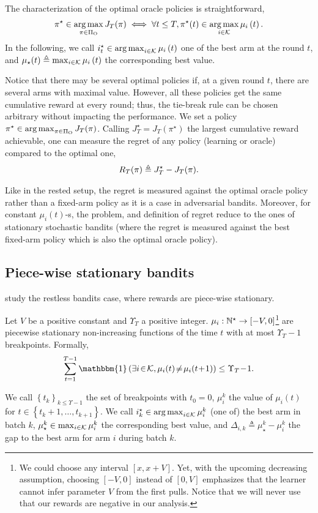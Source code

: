 \begin{proposition}
The characterization of the optimal oracle policies is straightforward,
\[\pi^\star \in \operatorname*{arg\,max}_{\pi \in \Pi_{\rm O}} J_T(\pi) \iff \forall t \leq T,  \pi^\star(t) \in \operatorname*{arg\,max}_{i \in \mathcal{K}} \mu_i\left(t\right).\]
In the following, we call $i^\star_t \in \operatorname*{arg\,max}_{i \in \mathcal{K}} \mu_i\left(t\right)$ one of the best arm at the round $t$, and $\mu_\star(t) \triangleq \max_{i \in \mathcal{K}} \mu_i\left(t\right)$ the corresponding best value.
\end{proposition}
Notice that there may be several optimal policies if, at a given round $t$, there are several arms with maximal value. However, all these policies get the same cumulative reward at every round; thus, the tie-break rule can be chosen arbitrary without impacting the performance.  We set a policy $\pi^\star\in \operatorname*{arg\,max}_{\pi \in \Pi_{\rm O}} J_T(\pi)$. Calling $J_T^\star = J_T(\pi^\star)$ the largest cumulative reward achievable, one can measure the regret of any policy (learning or oracle) compared to the optimal one, 
\begin{align}\label{eq:restless-regret}
R_T(\pi) \triangleq J^\star_T - J_T(\pi).
\end{align}
%
\begin{remark}
Like in the rested setup, the regret is measured against the optimal oracle policy rather than a fixed-arm policy as it is a case in adversarial bandits. Moreover, for constant $\mu_i(t)$-s, the problem, and definition of regret reduce to the ones of stationary stochastic bandits (where the regret is measured against the best fixed-arm policy which is also the optimal oracle policy). 
\end{remark}
%

\subsection{Piece-wise stationary bandits}
\label{subsec:piecewise}
\citet{garivier2011upper-confidence-bound} study the restless bandits case, where rewards are piece-wise stationary. 
 \begin{assumption}\label{assum:piece-wise}
Let $V$ be a positive constant and $\Upsilon_T$ a positive integer.  $\mu_i : {\mathbb N}^\star \rightarrow [- V, 0]$\footnote{We could choose any interval $\left[x, x+V\right]$. Yet, with the upcoming decreasing assumption, choosing $[- V, 0]$ instead of $[0, V]$ emphasizes that the learner cannot infer parameter $V$ from the first pulls. Notice that we will never use that our rewards are negative in our analysis.} are piecewise stationary non-increasing functions of the time $t$ with at most $\Upsilon_T-1$ breakpoints. Formally, 
\[\sum_{t=1}^{T-1} \mathbbm{1}\left(\exists i\!\in\! \arms, \mu_i(t) \!\neq\! \mu_i(t\!+\!1)\right)\leq \Upsilon_T\!-\!1.\]
\end{assumption}
%
 We call $\left\{t_k\right\}_{k \leq \Upsilon-1}$ the set of breakpoints with $t_0 = 0$, $\mu_i^k$ the value of $\mu_i(t)$ for $t \in \left\{t_k+1 , \dots, t_{k+1}\right\}$. We call $i^\star_k \in \operatorname*{arg\,max}_{i \in \mathcal{K}}{\mu_i^k}$ (one of) the best arm in batch $k$, $\mu_\star^k \in \max_{i \in \mathcal{K}}{\mu_i^k}$ the corresponding best value, and $\Delta_{i,k} \triangleq \mu_{\star}^k - \mu_i^k$ the gap to the best arm for arm $i$ during batch $k$.
%
